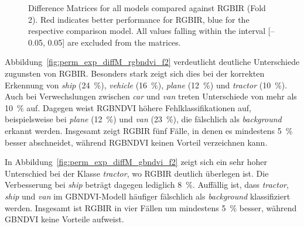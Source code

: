 \begin{figure}[htbp]
    \caption[Difference Matrices compared to RGBIR (Fold 2)]{Difference Matrices for all models compared against RGBIR (Fold 2). Red indicates better performance for RGBIR, blue for the respective comparison model. All values falling within the interval [–0.05, 0.05] are excluded from the matrices.}
    \label{fig:perm_exp_diffM_all}
\end{figure}

%     

Abbildung~\ref{fig:perm_exp_diffM_rgbndvi_f2} verdeutlicht deutliche Unterschiede zugunsten von RGBIR. Besonders stark zeigt sich dies bei der korrekten Erkennung von \textit{ship} (24~\%), \textit{vehicle} (16~\%), \textit{plane} (12~\%) und \textit{tractor} (10~\%). Auch bei Verwechslungen zwischen \textit{car} und \textit{van} treten Unterschiede von mehr als 10~\% auf. Dagegen weist RGBNDVI höhere Fehlklassifikationen auf, beispielsweise bei \textit{plane} (12~\%) und \textit{van} (23~\%), die fälschlich als \textit{background} erkannt werden. Insgesamt zeigt RGBIR fünf Fälle, in denen es mindestens 5~\% besser abschneidet, während RGBNDVI keinen Vorteil verzeichnen kann.

%     

In Abbildung~\ref{fig:perm_exp_diffM_gbndvi_f2} zeigt sich ein sehr hoher Unterschied bei der Klasse \textit{tractor}, wo RGBIR deutlich überlegen ist. Die Verbesserung bei \textit{ship} beträgt dagegen lediglich 8~\%. Auffällig ist, dass \textit{tractor}, \textit{ship} und \textit{van} im GBNDVI-Modell häufiger fälschlich als \textit{background} klassifiziert werden. Insgesamt ist RGBIR in vier Fällen um mindestens 5~\% besser, während GBNDVI keine Vorteile aufweist.

